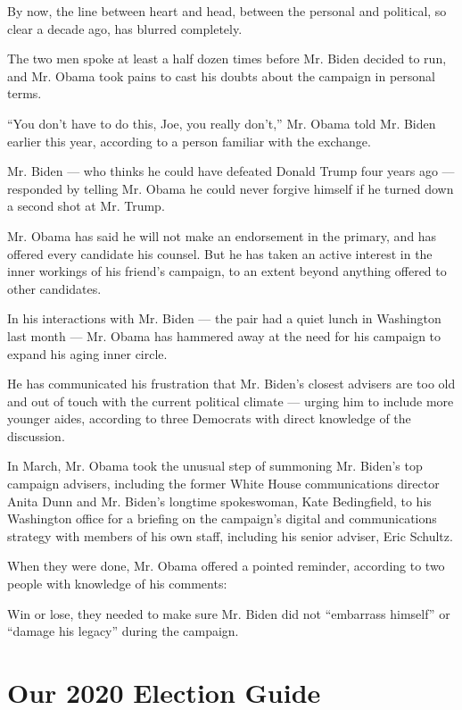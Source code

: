 By now, the line between heart and head, between the personal and
political, so clear a decade ago, has blurred completely.

The two men spoke at least a half dozen times before Mr. Biden decided
to run, and Mr. Obama took pains to cast his doubts about the campaign
in personal terms.

``You don't have to do this, Joe, you really don't,'' Mr. Obama told Mr.
Biden earlier this year, according to a person familiar with the
exchange.

Mr. Biden --- who thinks he could have defeated Donald Trump four years
ago --- responded by telling Mr. Obama he could never forgive himself if
he turned down a second shot at Mr. Trump.

Mr. Obama has said he will not make an endorsement in the primary, and
has offered every candidate his counsel. But he has taken an active
interest in the inner workings of his friend's campaign, to an extent
beyond anything offered to other candidates.

In his interactions with Mr. Biden --- the pair had a quiet lunch in
Washington last month --- Mr. Obama has hammered away at the need for
his campaign to expand his aging inner circle.

He has communicated his frustration that Mr. Biden's closest advisers
are too old and out of touch with the current political climate ---
urging him to include more younger aides, according to three Democrats
with direct knowledge of the discussion.

In March, Mr. Obama took the unusual step of summoning Mr. Biden's top
campaign advisers, including the former White House communications
director Anita Dunn and Mr. Biden's longtime spokeswoman, Kate
Bedingfield, to his Washington office for a briefing on the campaign's
digital and communications strategy with members of his own staff,
including his senior adviser, Eric Schultz.

When they were done, Mr. Obama offered a pointed reminder, according to
two people with knowledge of his comments:

Win or lose, they needed to make sure Mr. Biden did not ``embarrass
himself'' or ``damage his legacy'' during the campaign.

\hypertarget{our-2020-election-guide}{%
\section{Our 2020 Election Guide}\label{our-2020-election-guide}}

